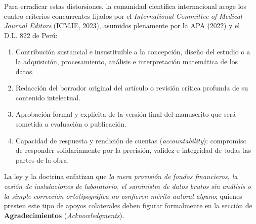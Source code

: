 Para erradicar estas distorsiones, la comunidad científica internacional acoge los cuatro criterios concurrentes fijados por el \textit{International Committee of Medical Journal Editors} (ICMJE, 2023), asumidos plenamente por la APA (2022) y el D.L. 822 de Perú:
\begin{enumerate}
    \item Contribución sustancial e insustituible a la concepción, diseño del estudio o a la adquisición, procesamiento, análisis e interpretación matemática de los datos.
    \item Redacción del borrador original del artículo o revisión crítica profunda de su contenido intelectual.
    \item Aprobación formal y explícita de la versión final del manuscrito que será sometida a evaluación o publicación.
    \item Capacidad de respuesta y rendición de cuentas (\textit{accountability}): compromiso de responder solidariamente por la precisión, validez e integridad de todas las partes de la obra.
\end{enumerate}

La ley y la doctrina enfatizan que \textit{la mera provisión de fondos financieros, la cesión de instalaciones de laboratorio, el suministro de datos brutos sin análisis o la simple corrección ortotipográfica no confieren mérito autoral alguno}; quienes presten este tipo de apoyos colaterales deben figurar formalmente en la sección de \textbf{Agradecimientos} (\textit{Acknowledgments}).


